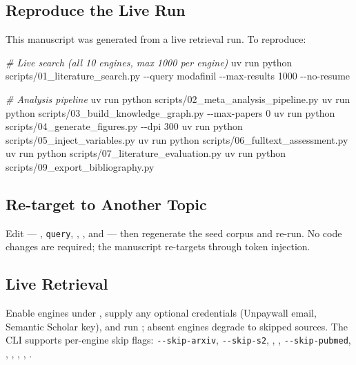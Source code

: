 \documentclass[
  english,
]{article}
\newenvironment{Shaded}{}{}
\newcommand{\AttributeTok}[1]{\textcolor[rgb]{0.49,0.56,0.16}{#1}}
\newcommand{\CommentTok}[1]{\textcolor[rgb]{0.38,0.63,0.69}{\textit{#1}}}
\newcommand{\ExtensionTok}[1]{#1}
\newcommand{\NormalTok}[1]{#1}
\begin{document}
\subsection{Reproduce the Live Run}\label{reproduce-the-live-run}

This manuscript was generated from a live retrieval run. To reproduce:

\begin{Shaded}
\begin{Highlighting}[]
\CommentTok{\# Live search (all 10 engines, max 1000 per engine)}
\ExtensionTok{uv}\NormalTok{ run python scripts/01\_literature\_search.py }\AttributeTok{{-}{-}query}\NormalTok{ modafinil }\AttributeTok{{-}{-}max{-}results}\NormalTok{ 1000 }\AttributeTok{{-}{-}no{-}resume}

\CommentTok{\# Analysis pipeline}
\ExtensionTok{uv}\NormalTok{ run python scripts/02\_meta\_analysis\_pipeline.py}
\ExtensionTok{uv}\NormalTok{ run python scripts/03\_build\_knowledge\_graph.py }\AttributeTok{{-}{-}max{-}papers}\NormalTok{ 0}
\ExtensionTok{uv}\NormalTok{ run python scripts/04\_generate\_figures.py }\AttributeTok{{-}{-}dpi}\NormalTok{ 300}
\ExtensionTok{uv}\NormalTok{ run python scripts/05\_inject\_variables.py}
\ExtensionTok{uv}\NormalTok{ run python scripts/06\_fulltext\_assessment.py}
\ExtensionTok{uv}\NormalTok{ run python scripts/07\_literature\_evaluation.py}
\ExtensionTok{uv}\NormalTok{ run python scripts/09\_export\_bibliography.py}
\end{Highlighting}
\end{Shaded}

\subsection{Re-target to Another
Topic}\label{re-target-to-another-topic}

Edit  ---
, \texttt{query},
, , and
 --- then regenerate the seed corpus and
re-run. No code changes are required; the manuscript re-targets through
token injection.

\subsection{Live Retrieval}\label{live-retrieval}

Enable engines under , supply any
optional credentials (Unpaywall email, Semantic Scholar key), and run
; absent engines degrade to
skipped sources. The CLI supports per-engine skip flags:
\texttt{-\/-skip-arxiv}, \texttt{-\/-skip-s2},
, ,
\texttt{-\/-skip-pubmed}, ,
, ,
, .
\end{document}
